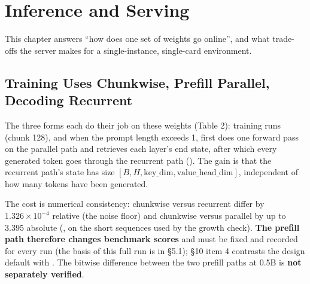 \documentclass[11pt,openany]{article}
\begin{document}
\section{Inference and Serving}

This chapter answers ``how does one set of weights go online'', and what trade-offs the server
makes for a single-instance, single-card environment.

\subsection{Training Uses Chunkwise, Prefill Parallel, Decoding Recurrent}

The three forms each do their job on these weights (Table 2): training runs
\linebreak[0] (chunk 128), and when the prompt length exceeds 1,  first
does one forward pass on the parallel path and retrieves each layer's end state, after which every
generated token goes through the recurrent path (\linebreak[0]\linebreak[0]). The gain is
that the recurrent path's state has size $[B,H,\mathrm{key\_dim},\mathrm{value\_head\_dim}]$,
independent of how many tokens have been generated.

The cost is numerical consistency: chunkwise versus recurrent differ by $1.326\times10^{-4}$
relative (the noise floor) and chunkwise versus parallel by up to 3.395 absolute
(\linebreak[0]\linebreak[0], on the short sequences used by the growth check).
\textbf{The prefill path therefore changes benchmark scores} and must be fixed and recorded for
every run (the basis of this full run is in \S5.1);  \S10 item 4 contrasts the
design default  with \linebreak[0]\linebreak[0]. The bitwise difference between
the two prefill paths at 0.5B is \textbf{not separately verified}.
\end{document}
